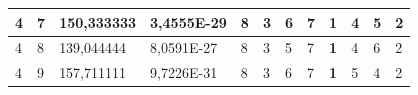 \documentclass[conference]{IEEEtran}
\begin{document}
\begin{table}[]
\begin{tabular}{|llll|llllllll|}
\multicolumn{1}{|l|}{4}                                                     & \multicolumn{1}{l|}{7}                                                        & \multicolumn{1}{l|}{150,333333}                                                   & 3,4555E-29                     & \multicolumn{1}{l|}{8}                                                  & \multicolumn{1}{l|}{3}                                                  & \multicolumn{1}{l|}{6}                                                  & \multicolumn{1}{l|}{7}                                                  & \multicolumn{1}{l|}{\textbf{1}}                                         & \multicolumn{1}{l|}{4}                                                  & \multicolumn{1}{l|}{5}                                                  & 2                          \\ \hline
\multicolumn{1}{|l|}{4}                                                     & \multicolumn{1}{l|}{8}                                                        & \multicolumn{1}{l|}{139,044444}                                                   & 8,0591E-27                     & \multicolumn{1}{l|}{8}                                                  & \multicolumn{1}{l|}{3}                                                  & \multicolumn{1}{l|}{5}                                                  & \multicolumn{1}{l|}{7}                                                  & \multicolumn{1}{l|}{\textbf{1}}                                         & \multicolumn{1}{l|}{4}                                                  & \multicolumn{1}{l|}{6}                                                  & 2                          \\ \hline
\multicolumn{1}{|l|}{4}                                                     & \multicolumn{1}{l|}{9}                                                        & \multicolumn{1}{l|}{157,711111}                                                   & 9,7226E-31                     & \multicolumn{1}{l|}{8}                                                  & \multicolumn{1}{l|}{3}                                                  & \multicolumn{1}{l|}{6}                                                  & \multicolumn{1}{l|}{7}                                                  & \multicolumn{1}{l|}{\textbf{1}}                                         & \multicolumn{1}{l|}{5}                                                  & \multicolumn{1}{l|}{4}                                                  & 2                          \\ \hline

\end{tabular}
\end{table}
\end{document}
